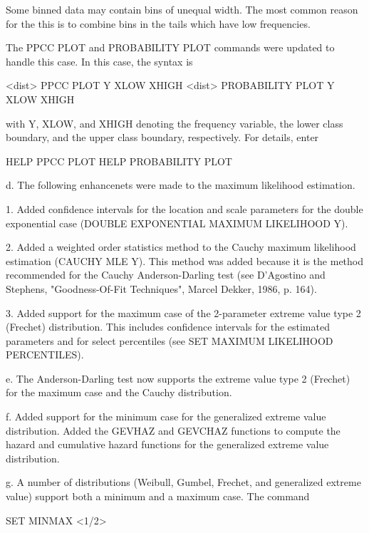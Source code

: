 {       Some binned data may contain bins of unequal width.  The
       most common reason for the this is to combine bins in the
       tails which have low frequencies.

       The PPCC PLOT and PROBABILITY PLOT commands were updated
       to handle this case.  In this case, the syntax is

           <dist> PPCC PLOT Y XLOW XHIGH
           <dist> PROBABILITY PLOT Y XLOW XHIGH

       with Y, XLOW, and XHIGH denoting the frequency variable,
       the lower class boundary, and the upper class boundary,
       respectively.  For details, enter

           HELP PPCC PLOT
           HELP PROBABILITY PLOT

    d. The following enhancenets were made to the maximum
       likelihood estimation.

       1. Added confidence intervals for the location and scale
          parameters for the double exponential case
          (DOUBLE EXPONENTIAL MAXIMUM LIKELIHOOD Y).

       2. Added a weighted order statistics method to the Cauchy
          maximum likelihood estimation (CAUCHY MLE Y).  This method
          was added because it is the method recommended for the
          Cauchy Anderson-Darling test (see D'Agostino and Stephens,
          "Goodness-Of-Fit Techniques", Marcel Dekker, 1986, p. 164).

       3. Added support for the maximum case of the 2-parameter
          extreme value type 2 (Frechet) distribution.  This includes
          confidence intervals for the estimated parameters and
          for select percentiles (see
          SET MAXIMUM LIKELIHOOD PERCENTILES).

    e. The Anderson-Darling test now supports the extreme value
       type 2 (Frechet) for the maximum case and the Cauchy
       distribution.

    f. Added support for the minimum case for the generalized
       extreme value distribution.  Added the GEVHAZ and GEVCHAZ
       functions to compute the hazard and cumulative hazard
       functions for the generalized extreme value distribution.

    g. A number of distributions (Weibull, Gumbel, Frechet,
       and generalized extreme value) support both a minimum and
       a maximum case.  The command

           SET MINMAX <1/2>

}
